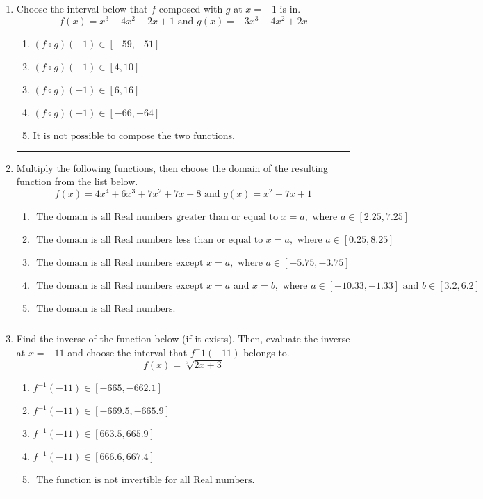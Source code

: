 \documentclass[14pt]{extbook}
\newcommand{\litem}[1]{\item#1\hspace*{-1cm}\rule{\textwidth}{0.4pt}}
\begin{document}
\begin{enumerate}
{\begin{enumerate}[label=\Alph*.]
\end{enumerate} }
\litem{
Choose the interval below that $f$ composed with $g$ at $x=-1$ is in.\[ f(x) = x^{3} -4 x^{2} -2 x + 1 \text{ and } g(x) = -3x^{3} -4 x^{2} +2 x \]\begin{enumerate}[label=\Alph*.]
\item \( (f \circ g)(-1) \in [-59, -51] \)
\item \( (f \circ g)(-1) \in [4, 10] \)
\item \( (f \circ g)(-1) \in [6, 16] \)
\item \( (f \circ g)(-1) \in [-66, -64] \)
\item \( \text{It is not possible to compose the two functions.} \)

\end{enumerate} }
\litem{
Multiply the following functions, then choose the domain of the resulting function from the list below.\[ f(x) = 4x^{4} +6 x^{3} +7 x^{2} +7 x + 8 \text{ and } g(x) = x^{2} +7 x + 1 \]\begin{enumerate}[label=\Alph*.]
\item \( \text{ The domain is all Real numbers greater than or equal to } x = a, \text{ where } a \in [2.25, 7.25] \)
\item \( \text{ The domain is all Real numbers less than or equal to } x = a, \text{ where } a \in [0.25, 8.25] \)
\item \( \text{ The domain is all Real numbers except } x = a, \text{ where } a \in [-5.75, -3.75] \)
\item \( \text{ The domain is all Real numbers except } x = a \text{ and } x = b, \text{ where } a \in [-10.33, -1.33] \text{ and } b \in [3.2, 6.2] \)
\item \( \text{ The domain is all Real numbers. } \)

\end{enumerate} }
\litem{
Find the inverse of the function below (if it exists). Then, evaluate the inverse at $x = -11$ and choose the interval that $f^-1(-11)$ belongs to.\[ f(x) = \sqrt[3]{2 x + 3} \]\begin{enumerate}[label=\Alph*.]
\item \( f^{-1}(-11) \in [-665, -662.1] \)
\item \( f^{-1}(-11) \in [-669.5, -665.9] \)
\item \( f^{-1}(-11) \in [663.5, 665.9] \)
\item \( f^{-1}(-11) \in [666.6, 667.4] \)
\item \( \text{ The function is not invertible for all Real numbers. } \)


\end{enumerate}}
\end{enumerate}
\end{document}
